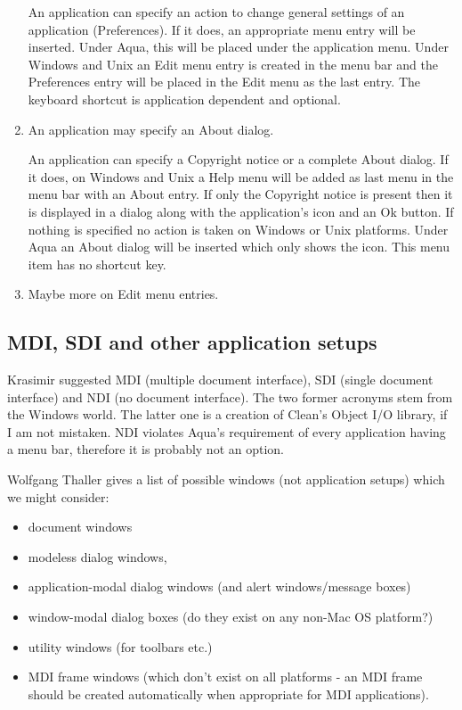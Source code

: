 \documentclass{article}
\begin{document}
\begin{enumerate}
  An application can specify an action to change general settings of
  an application (Preferences). If it does, an appropriate menu entry
  will be inserted. Under Aqua, this will be placed under the
  application menu. Under Windows and Unix an Edit menu entry is
  created in the menu bar and the Preferences entry will be placed in
  the Edit menu as the last entry. The keyboard shortcut is
  application dependent and optional.

\item An application may specify an About dialog.
  
  An application can specify a Copyright notice or a complete About
  dialog. If it does, on Windows and Unix a Help menu will be added as
  last menu in the menu bar with an About entry. If only the Copyright
  notice is present then it is displayed in a dialog along with the
  application's icon and an Ok button. If nothing is specified no
  action is taken on Windows or Unix platforms. Under Aqua an About
  dialog will be inserted which only shows the icon. This menu item
  has no shortcut key.
  
\item Maybe more on Edit menu entries.
\end{enumerate}

\subsection{MDI, SDI and other application setups}
Krasimir suggested MDI (multiple document interface), SDI (single
document interface) and NDI (no document interface). The two former
acronyms stem from the Windows world. The latter one is a creation of
Clean's Object I/O library, if I am not mistaken. NDI violates Aqua's
requirement of every application having a menu bar, therefore it is
probably not an option.

Wolfgang Thaller gives a list of possible windows (not application
setups) which we might consider:
\begin{itemize}
\item document windows
\item modeless dialog windows,
\item application-modal dialog windows (and alert windows/message boxes)
\item window-modal dialog boxes (do they exist on any non-Mac OS platform?)
\item utility windows (for toolbars etc.)
\item MDI frame windows (which don't exist on all platforms - an MDI
  frame should be created automatically when appropriate for MDI
  applications).
\end{itemize}
\end{document}
